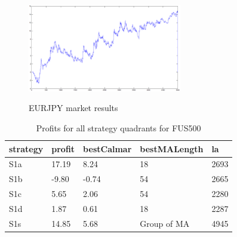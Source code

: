 \documentclass{tewiart}
\begin{document}
\begin{figure}[h]
\begin{minipage}{\linewidth}
\centering
\includegraphics[width=0.6\textwidth]{images/eurjpyD.eps}
\label{mansard}
\end{minipage}
\caption{EURJPY market results}
\end{figure}
\newpage
\begin{table}[!t]
\caption{Profits for all strategy quadrants for FUS500}
 \begin{center}
 \begin{tabular}{|l|l|l|l|l|}
 \hline \textbf{strategy} & \textbf{profit} & \textbf{bestCalmar} & \textbf{bestMALength} & \textbf{la} \\ \hline
S1a & 17.19 & 8.24 & 18 & 2693\\ \hline
S1b & -9.80 & -0.74 & 54 & 2665\\ \hline
S1c & 5.65 & 2.06 & 54 & 2280\\ \hline
S1d & 1.87 & 0.61 & 18 & 2287\\ \hline
S1s & 14.85 & 5.68 & Group of MA & 4945\\
\hline \end{tabular}
 \end{center}
 \end{table}
\FloatBarrier
\end{document}
